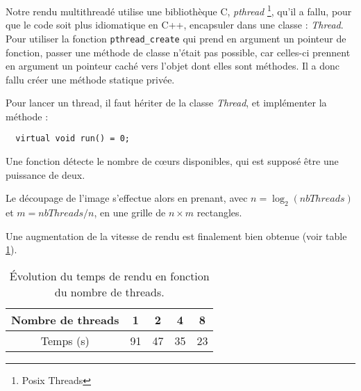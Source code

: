   Notre rendu multithreadé utilise une bibliothèque C, \emph{pthread} \footnote{Posix Threads}, qu'il a fallu, pour que le code soit plus idiomatique en C++, 
  encapsuler dans une classe : \emph{Thread}. Pour utiliser la fonction \verb|pthread_create| qui prend en argument un pointeur de fonction, passer une méthode de classe
  n'était pas possible, car celles-ci prennent en argument un pointeur caché vers l'objet dont elles sont méthodes. Il a donc fallu créer une méthode statique privée.
  
  Pour lancer un thread, il faut hériter de la classe \emph{Thread}, et implémenter la méthode :
  \begin{lstlisting}
  virtual void run() = 0;
  \end{lstlisting}
  
  Une fonction détecte le nombre de cœurs disponibles, qui est supposé être une puissance de deux.
  
  Le découpage de l'image s'effectue alors en prenant, avec $ n = \log_2(nbThreads) $ et $ m = nbThreads / n$, en une grille de $n \times m$ rectangles.
  
 Une augmentation de la vitesse de rendu est finalement bien obtenue (voir table \ref{tempsRendu}).
  
 \begin{table}
 \begin{center}
   \begin{tabular}{|c|c|c|c|c|}
  \hline 
  Nombre de threads & 1 & 2 & 4 & 8 \\ 
  \hline 
  Temps (s) & 91 & 47 & 35 & 23 \\ 
  \hline 
  \end{tabular}
 \end{center}
  \caption{Évolution du temps de rendu en fonction du nombre de threads.} \label{tempsRendu}
\end{table}  

 